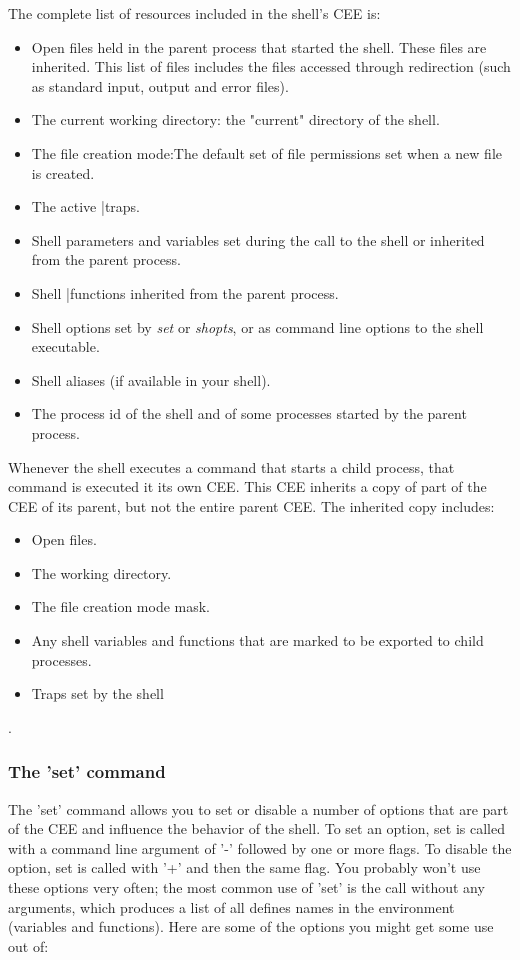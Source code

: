 The complete list of resources included in the shell's CEE is:
\begin{itemize}
\setlength{\leftmargin}{0pt}
\setlength{\itemsep}{0pt}
\setlength{\parsep}{0pt}
\setlength{\parskip}{0pt}
\item Open files held in the parent process that started the shell. These files
are inherited. This list of files includes the files accessed through
redirection (such as standard input, output and error files).
\item The current working directory: the "current" directory of the shell.
\item The file creation mode:The default set of file permissions set when a new
file is created.
\item The active |traps.
\item Shell parameters and variables set during the call to the shell or
inherited from the parent process.
\item Shell |functions inherited from the parent process.
\item Shell options set by \textit{set} or \textit{shopts}, or as command line
options to the shell executable.
\item Shell aliases (if available in your shell).
\item The process id of the shell and of some processes started by the parent
process.
\end{itemize}

Whenever the shell executes a command that starts a child process, that command
is executed it its own CEE. This CEE inherits a copy of part of the CEE of its
parent, but not the entire parent CEE. The inherited copy includes:

\begin{itemize}
\setlength{\leftmargin}{0pt}
\setlength{\itemsep}{0pt}
\setlength{\parsep}{0pt}
\setlength{\parskip}{0pt}
\item Open files.
\item The working directory.
\item The file creation mode mask.
\item Any shell variables and functions that are marked to be exported to child processes.
\item Traps set by the shell
\end{itemize}.

\subsubsection{The 'set' command}
The 'set' command allows you to set or disable a number of options that are
part of the CEE and influence the behavior of the shell. To set an option, set
is called with a command line argument of '-' followed by one or more flags. To
disable the option, set is called with '+' and then the same flag. You probably
won't use these options very often; the most common use of 'set' is the call
without any arguments, which produces a list of all defines names in the
environment (variables and functions). Here are some of the options you might
get some use out of:

